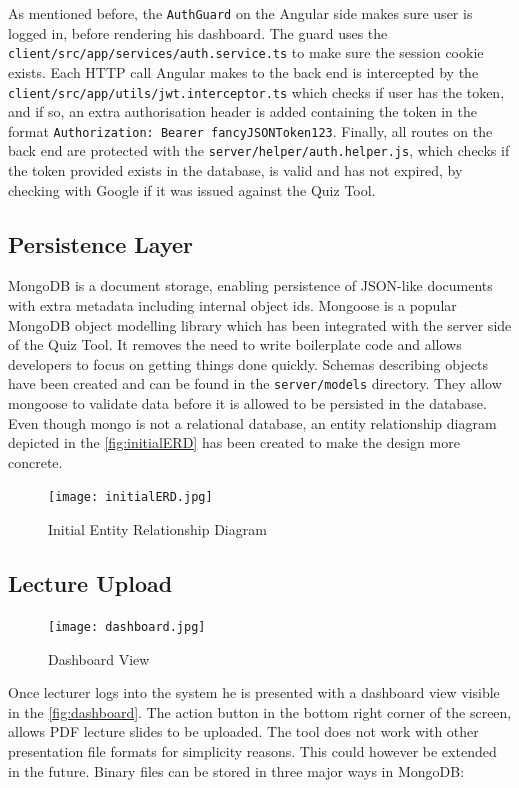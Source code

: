 As mentioned before, the \texttt{AuthGuard} on the Angular side makes sure user is logged in, before
rendering his dashboard. The guard uses the \texttt{client/src/app/services/auth.service.ts} to make
sure the session cookie exists. Each HTTP call Angular makes to the back end is intercepted by
the \texttt{client/src/app/utils/jwt.interceptor.ts} which checks if user has the token, and if so,
an extra authorisation header is added containing the token in the format \texttt{Authorization: Bearer fancyJSONToken123}.
Finally, all routes on the back end are protected with the \texttt{server/helper/auth.helper.js}, which
checks if the token provided exists in the database, is valid and has not expired, by checking with Google if it was issued
against the Quiz Tool.

\subsection{Persistence Layer}
MongoDB is a document storage, enabling persistence of JSON-like documents with extra metadata
including internal object ids. Mongoose\cite{48} is a popular MongoDB object modelling library which has
been integrated with the server side of the Quiz Tool. It removes the need to write boilerplate code and
allows developers to focus on getting things done quickly. Schemas describing objects have been created
and can be found in the \texttt{server/models} directory. They allow mongoose to validate data before
it is allowed to be persisted in the database. Even though mongo is not a relational database, an
entity relationship diagram depicted in the \autoref{fig:initialERD} has been created to make the design more concrete.

\begin{figure}[h!]
    \centering
    \texttt{[image: initialERD.jpg]}
    \caption{Initial Entity Relationship Diagram}
    \label{fig:initialERD}
\end{figure}

\subsection{Lecture Upload}

\begin{figure}[h!]
    \centering
    \texttt{[image: dashboard.jpg]}
    \caption{Dashboard View}
    \label{fig:dashboard}
\end{figure}

Once lecturer logs into the system he is presented with a dashboard view visible in the \autoref{fig:dashboard}.
The action button in the bottom right corner of the screen, allows PDF lecture slides to be uploaded.
The tool does not work with other presentation file formats for simplicity reasons. This could however
be extended in the future. Binary files can be stored in three major ways in MongoDB:

